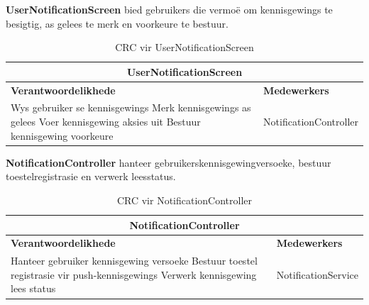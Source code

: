 \textbf{UserNotificationScreen} bied gebruikers die vermoë om kennisgewings te besigtig, as gelees te merk en voorkeure te bestuur.
\begin{table}[H]\centering\begin{tabular}{|p{}|p{}|}
    \hline
    \multicolumn{2}{|c|}{\textbf{UserNotificationScreen}} \\
    \hline
    \textbf{Verantwoordelikhede} & \textbf{Medewerkers} \\
    \hline
    Wys gebruiker se kennisgewings \newline
    Merk kennisgewings as gelees \newline
    Voer kennisgewing aksies uit \newline
    Bestuur kennisgewing voorkeure
    &
    NotificationController \\
    \hline
\end{tabular}
\caption{CRC vir UserNotificationScreen}
\label{tab:crc_user_notification_screen}
\end{table}

\textbf{NotificationController} hanteer gebruikerskennisgewingversoeke, bestuur toestelregistrasie en verwerk leesstatus.
\begin{table}[H]\centering\begin{tabular}{|p{}|p{}|}
    \hline
    \multicolumn{2}{|c|}{\textbf{NotificationController}} \\
    \hline
    \textbf{Verantwoordelikhede} & \textbf{Medewerkers} \\
    \hline
    Hanteer gebruiker kennisgewing versoeke \newline
    Bestuur toestel registrasie vir push-kennisgewings \newline
    Verwerk kennisgewing lees status
    &
    NotificationService \\
    \hline
\end{tabular}
\caption{CRC vir NotificationController}
\label{tab:crc_notification_controller}
\end{table}

